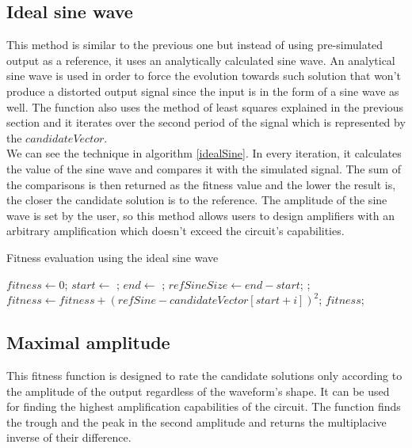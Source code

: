 \subsection{Ideal sine wave}
This method is similar to the previous one but instead of using pre-simulated output as a reference, it uses an analytically calculated sine wave. An analytical sine wave is used in order to force the evolution towards such solution that won't produce a distorted output signal since the input is in the form of a sine wave as well. The function also uses the method of least squares explained in the previous section and it iterates over the second period of the signal which is represented by the $candidateVector$.\\
We can see the technique in algorithm \ref{idealSine}. In every iteration, it calculates the value of the sine wave and compares it with the simulated signal. The sum of the comparisons is then returned as the fitness value and the lower the result is, the closer the candidate solution is to the reference. The amplitude of the sine wave is set by the user, so this method allows users to design amplifiers with an arbitrary amplification which doesn't exceed the circuit's capabilities.

\begin{algorithm}
\caption{Fitness evaluation using the ideal sine wave}
\label{idealSine}
\begin{algorithmic}[1]
        \State $fitness \gets 0$;
        \State $start \gets$ ;
        \State $end \gets$ ;
        \State $refSineSize \gets end - start$;
           \State {};
           \State $fitness \gets fitness + (refSine - candidateVector[start + i])^2$;
        \EndFor
        \State \Return $fitness$;
    \EndFunction
\end{algorithmic}
\end{algorithm}

\subsection{Maximal amplitude}
This fitness function is designed to rate the candidate solutions only according to the amplitude of the output regardless of the waveform's shape. It can be used for finding the highest amplification capabilities of the circuit. The function finds the trough and the peak in the second amplitude and returns the multiplacive inverse of their difference.

